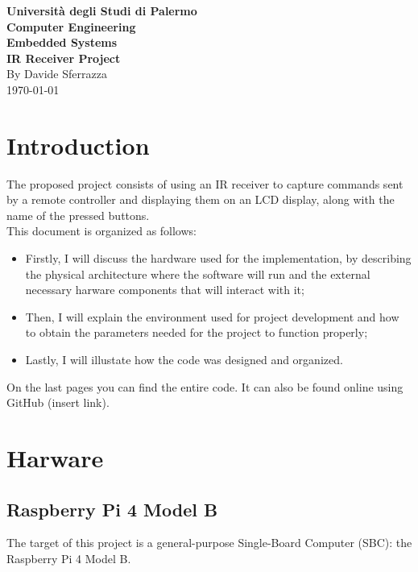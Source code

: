 \documentclass[a4paper, 12pt]{article}
\begin{document}
\begin{titlepage}
    \begin{center}
        \vspace*{1cm}
        \Large\textbf{Università degli Studi di Palermo } \\
        \Large\textbf{Computer Engineering} \\
        \vfill
        \Huge\textbf{Embedded Systems} \\[3mm]
        \Large\textbf{IR Receiver Project} \\[1mm]
        \vfill
        By Davide Sferrazza\\
        \today
    \end{center}
\end{titlepage}

\tableofcontents
\thispagestyle{empty}
\clearpage

\setcounter{page}{1}

\section{Introduction}
The proposed project consists of using an IR receiver to capture commands sent by a remote controller and displaying them on an LCD display, along with the name of the pressed buttons. \\
This document is organized as follows:
\begin{itemize}
    \item Firstly, I will discuss the hardware used for the implementation, by describing the physical architecture where the software will run and the external necessary harware components that will interact with it;
    \item  Then, I will explain the environment used for project development and how to obtain the parameters needed for the project to function properly;
    \item Lastly, I will illustate how the code was designed and organized.
\end{itemize}

On the last pages you can find the entire code. It can also be found online using GitHub (insert link). 

\section{Harware}
\subsection{Raspberry Pi 4 Model B}
The target of this project is a general-purpose Single-Board Computer (SBC): the Raspberry Pi 4 Model B. 
\end{document}
